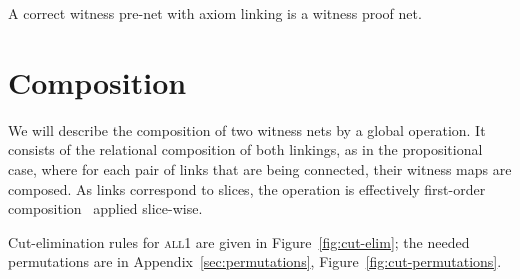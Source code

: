 \documentclass[twoside,a4paper]{article}
\newcommand\all{\textsc{all}}
\newcommand\+{+}
\renewcommand\*{\times}
\newcommand\dual[1]{\overline{#1}}
\begin{document}

\begin{corollary}
A correct witness pre-net with axiom linking is a witness proof net.
\end{corollary}


%




\section{Composition}

\newlength\seriously
\setlength\seriously\parindent
\parbox[b]{.6\columnwidth}{
We will describe the composition of two witness nets by a global operation. It consists of the relational composition of both linkings, as in the propositional case, where for each pair of links that are being connected, their witness maps are composed. As links correspond to slices, the operation is effectively first-order composition~\cite{Mimram-2011} applied slice-wise.

\setlength\parindent\seriously
\indent
Cut-elimination rules for \all1 are given in Figure~\ref{fig:cut-elim}; the needed permutations are in Appendix~\ref{sec:permutations}, Figure~\ref{fig:cut-permutations}.
}
\quad
{}
\end{document}
